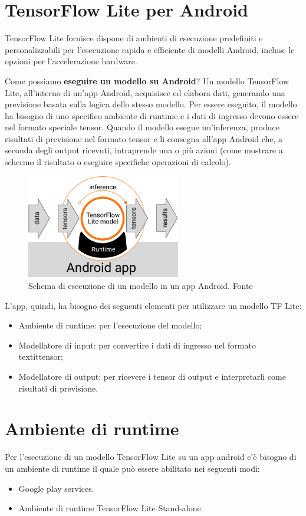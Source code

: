 \section{TensorFlow Lite per Android}
TensorFlow Lite fornisce dispone di ambienti di esecuzione predefiniti e personalizzabili per l’esecuzione rapida e efficiente di modelli Android, incluse le opzioni per l'accelerazione hardware.

Come possiamo \textbf{eseguire un modello su Android}? Un modello TensorFlow Lite, all’interno di un’app Android, acquisisce ed elabora dati, generando una previsione basata sulla logica dello stesso modello.
Per essere eseguito, il modello ha bisogno di uno specifico ambiente di runtime e i dati di ingresso devono essere nel formato speciale tensor. Quando il modello esegue un’inferenza, produce risultati di
previsione nel formato tensor e li consegna all’app Android che, a seconda degli output ricevuti, intraprende una o più azioni (come mostrare a schermo il risultato o eseguire specifiche operazioni di calcolo).

\begin{figure}[ht]
    \centering
    \includegraphics[width=0.6\textwidth]{Immagini/esecuzione.png}
    \caption{Schema di esecuzione di un modello in un app Android. Fonte }
    \label{fig:esecuzione}
\end{figure}

L’app, quindi, ha bisogno dei seguenti elementi per utilizzare un modello TF Lite:
\begin{itemize}
    \item Ambiente di runtime: per l’esecuzione del modello;
    \item Modellatore di input: per convertire i dati di ingresso nel formato textit{tensor};
    \item Modellatore di output: per ricevere i tensor di output e interpretarli come risultati di previsione.
\end{itemize}

\section{Ambiente di runtime}
Per l’esecuzione di un modello TensorFlow Lite su un app android c’è bisogno di un ambiente di runtime il quale può essere abilitato nei seguenti modi:
\begin{itemize}
    \item Google play services.
    \item Ambiente di runtime TensorFlow Lite Stand-alone.
\end{itemize}

